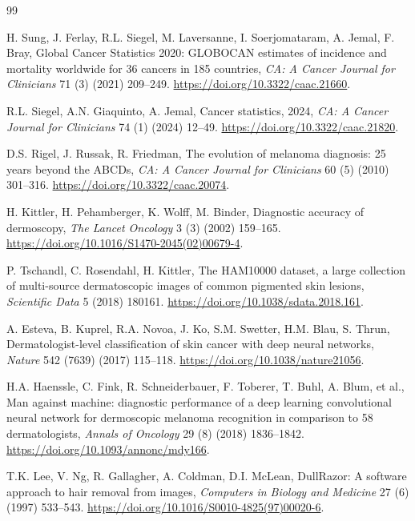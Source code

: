 \documentclass[11pt,a4paper]{article}
\begin{document}
\begin{thebibliography}{99}

H. Sung, J. Ferlay, R.L. Siegel, M. Laversanne, I. Soerjomataram, A. Jemal, F. Bray, Global Cancer Statistics 2020: GLOBOCAN estimates of incidence and mortality worldwide for 36 cancers in 185 countries, \textit{CA: A Cancer Journal for Clinicians} 71 (3) (2021) 209--249. \url{https://doi.org/10.3322/caac.21660}.

R.L. Siegel, A.N. Giaquinto, A. Jemal, Cancer statistics, 2024, \textit{CA: A Cancer Journal for Clinicians} 74 (1) (2024) 12--49. \url{https://doi.org/10.3322/caac.21820}.

D.S. Rigel, J. Russak, R. Friedman, The evolution of melanoma diagnosis: 25 years beyond the ABCDs, \textit{CA: A Cancer Journal for Clinicians} 60 (5) (2010) 301--316. \url{https://doi.org/10.3322/caac.20074}.

H. Kittler, H. Pehamberger, K. Wolff, M. Binder, Diagnostic accuracy of dermoscopy, \textit{The Lancet Oncology} 3 (3) (2002) 159--165. \url{https://doi.org/10.1016/S1470-2045(02)00679-4}.

P. Tschandl, C. Rosendahl, H. Kittler, The HAM10000 dataset, a large collection of multi-source dermatoscopic images of common pigmented skin lesions, \textit{Scientific Data} 5 (2018) 180161. \url{https://doi.org/10.1038/sdata.2018.161}.

A. Esteva, B. Kuprel, R.A. Novoa, J. Ko, S.M. Swetter, H.M. Blau, S. Thrun, Dermatologist-level classification of skin cancer with deep neural networks, \textit{Nature} 542 (7639) (2017) 115--118. \url{https://doi.org/10.1038/nature21056}.

H.A. Haenssle, C. Fink, R. Schneiderbauer, F. Toberer, T. Buhl, A. Blum, et al., Man against machine: diagnostic performance of a deep learning convolutional neural network for dermoscopic melanoma recognition in comparison to 58 dermatologists, \textit{Annals of Oncology} 29 (8) (2018) 1836--1842. \url{https://doi.org/10.1093/annonc/mdy166}.

T.K. Lee, V. Ng, R. Gallagher, A. Coldman, D.I. McLean, DullRazor: A software approach to hair removal from images, \textit{Computers in Biology and Medicine} 27 (6) (1997) 533--543. \url{https://doi.org/10.1016/S0010-4825(97)00020-6}.


\end{thebibliography}
\end{document}
